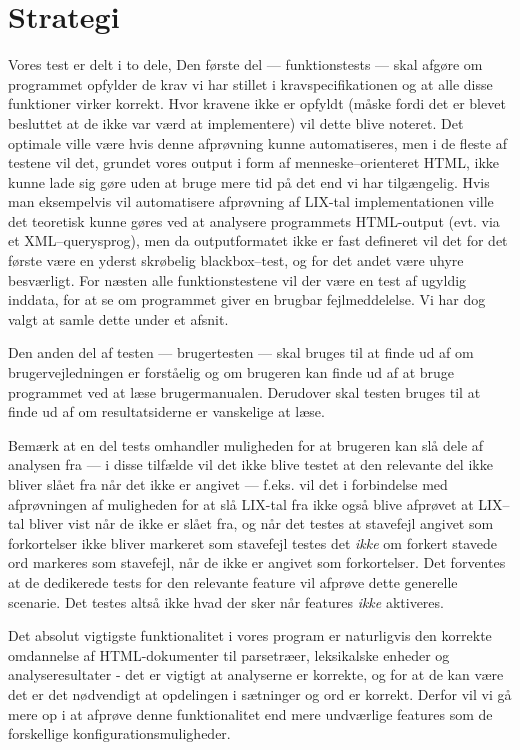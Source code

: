 \documentclass[a4paper,oneside,article]{memoir}
\begin{document}
\chapter{Strategi}
Vores test er delt i to dele, Den første del --- funktionstests ---
skal afgøre om programmet opfylder de krav vi har stillet i
kravspecifikationen og at alle disse funktioner virker korrekt. Hvor
kravene ikke er opfyldt (måske fordi det er blevet besluttet at de
ikke var værd at implementere) vil dette blive noteret. Det optimale
ville være hvis denne afprøvning kunne automatiseres, men i de fleste
af testene vil det, grundet vores output i form af
menneske--orienteret HTML, ikke kunne lade sig gøre uden at bruge mere
tid på det end vi har tilgængelig. Hvis man eksempelvis vil
automatisere afprøvning af LIX-tal implementationen ville det
teoretisk kunne gøres ved at analysere programmets HTML-output
(evt. via et XML--querysprog), men da outputformatet ikke er fast
defineret vil det for det første være en yderst skrøbelig
blackbox--test, og for det andet være uhyre besværligt. For næsten
alle funktionstestene vil der være en test af ugyldig inddata, for at
se om programmet giver en brugbar fejlmeddelelse. Vi har dog valgt at
samle dette under et afsnit.

Den anden del af testen --- brugertesten --- skal bruges til at finde
ud af om brugervejledningen er forståelig og om brugeren kan finde ud
af at bruge programmet ved at læse brugermanualen. Derudover skal
testen bruges til at finde ud af om resultatsiderne er vanskelige at
læse.

Bemærk at en del tests omhandler muligheden for at brugeren kan slå
dele af analysen fra --- i disse tilfælde vil det ikke blive testet at
den relevante del ikke bliver slået fra når det ikke er angivet ---
f.eks. vil det i forbindelse med afprøvningen af muligheden for at slå
LIX-tal fra ikke også blive afprøvet at LIX--tal bliver vist når de
ikke er slået fra, og når det testes at stavefejl angivet som
forkortelser ikke bliver markeret som stavefejl testes det
\textit{ikke} om forkert stavede ord markeres som stavefejl, når de
ikke er angivet som forkortelser. Det forventes at de dedikerede tests
for den relevante feature vil afprøve dette generelle scenarie. Det
testes altså ikke hvad der sker når features \textit{ikke} aktiveres.

Det absolut vigtigste funktionalitet i vores program er naturligvis
den korrekte omdannelse af HTML-dokumenter til parsetræer, leksikalske
enheder og analyseresultater - det er vigtigt at analyserne er
korrekte, og for at de kan være det er det nødvendigt at opdelingen i
sætninger og ord er korrekt. Derfor vil vi gå mere op i at afprøve
denne funktionalitet end mere undværlige features som de forskellige
konfigurationsmuligheder.
\end{document}
